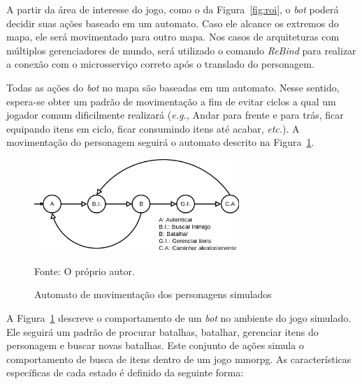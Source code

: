 A partir da área de interesse do jogo, como o da Figura~\ref{fig:roi}, o \textit{bot} poderá decidir suas ações baseado em um automato.
%
Caso ele alcance os extremos do mapa, ele será movimentado para outro mapa.
%
Nos casos de arquiteturas com múltiplos gerenciadores de mundo, será utilizado o comando \textit{ReBind} para realizar a conexão com o microsserviço correto após o translado do personagem.



Todas as ações do \textit{bot} no mapa são baseadas em um automato.
%
Nesse sentido, espera-se obter um padrão de movimentação a fim de evitar ciclos a qual um jogador comum dificilmente realizará (\textit{e.g.,} Andar para frente e para trás, ficar equipando itens em ciclo, ficar consumindo itens até acabar, \textit{etc.}).
%
A movimentação do personagem seguirá o automato descrito na Figura~\ref{fig:movimentacao}.


\begin{figure}[htb!]
  \caption{Automato de movimentação dos personagens simulados}
  \label{fig:movimentacao}
  \includegraphics[height=3.5cm]{img/cap3/movimentacao.png}
  \centering

  Fonte: O próprio autor.
\end{figure}

A Figura~\ref{fig:movimentacao} descreve o comportamento de um \textit{bot} no ambiente do jogo simulado.
%
Ele seguirá um padrão de procurar batalhas, batalhar, gerenciar itens do personagem e buscar novas batalhas.
%
Este conjunto de ações simula o comportamento de busca de itens dentro de um jogo \ac{mmorpg}.
%
As características específicas de cada estado é definido da seguinte forma:

